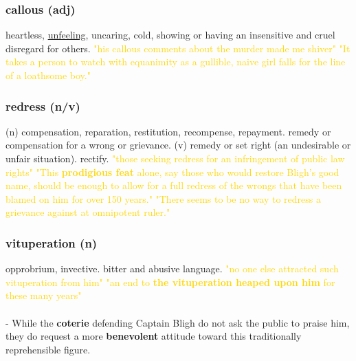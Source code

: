 \documentclass{proc}
\begin{document}
	\subsubsection{\textcolor{brickred}{callous} (adj)}
	heartless,
	\underline{unfeeling},
	uncaring,
	cold, showing or having an insensitive and cruel disregard for others.
	\textcolor{gold}{"his callous comments about the murder made me shiver" "It takes a person to watch with equanimity as a gullible, naive girl falls for the line of a loathsome boy."}
	
	\subsubsection{\textcolor{brickred}{redress} (n/v)}
	(n) compensation,
	reparation,
	restitution,
	recompense,
	repayment. remedy or compensation for a wrong or grievance.
	(v) remedy or set right (an undesirable or unfair situation). rectify.
	\textcolor{gold}{"those seeking redress for an infringement of public law rights" "This \textbf{prodigious feat} alone, say those who would 
		restore Bligh's good name, should be enough to allow for a full 
		redress of the wrongs that have been blamed on him for over 
		150 years." "There seems to be no way to redress a grievance against at omnipotent 
		ruler."}
	
	\subsubsection{\textcolor{brickred}{vituperation} (n)}
	opprobrium, invective. bitter and abusive language.
	\textcolor{gold}{"no one else attracted such vituperation from him" "an end to \textbf{the vituperation heaped upon him} for these many years"}\\\\
	
	- While the \textbf{coterie} defending Captain Bligh do not 
	ask the public to praise him, they do request a more 
	\textbf{benevolent} attitude toward this traditionally reprehensible 
	figure.
	
	\newpage
	\setcounter{section}{40}
	\setcounter{subsection}{0}
	
	
	\subsection{}
\end{document}
